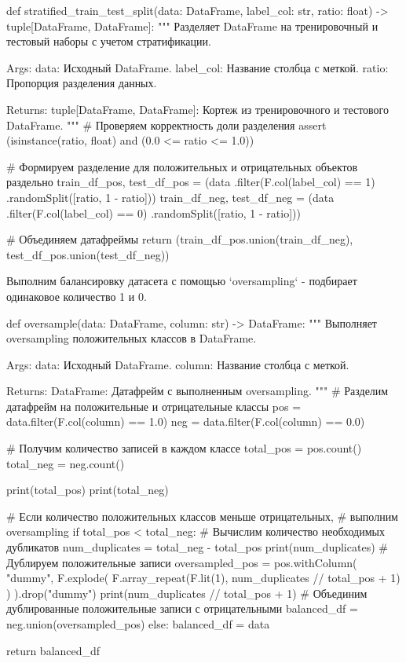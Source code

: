 \begin{code}
def stratified_train_test_split(data: DataFrame, 
                                label_col: str,
                                ratio: float) -> tuple[DataFrame, DataFrame]:
    """
    Разделяет DataFrame на тренировочный и тестовый наборы с учетом стратификации.

    Args:
        data: Исходный DataFrame.
        label_col: Название столбца с меткой.
        ratio: Пропорция разделения данных.

    Returns:
        tuple[DataFrame, DataFrame]: Кортеж из тренировочного и тестового DataFrame.
    """
    # Проверяем корректность доли разделения
    assert (isinstance(ratio, float) and (0.0 <= ratio <= 1.0))
    
    # Формируем разделение для положительных и отрицательных объектов раздельно
    train_df_pos, test_df_pos = (data
                                 .filter(F.col(label_col) == 1)
                                 .randomSplit([ratio, 1 - ratio]))
    train_df_neg, test_df_neg = (data
                                 .filter(F.col(label_col) == 0)
                                 .randomSplit([ratio, 1 - ratio]))
    
    # Объединяем датафреймы
    return (train_df_pos.union(train_df_neg),
            test_df_pos.union(test_df_neg))
\end{code}


\p Выполним балансировку датасета с помощью `oversampling` - подбирает одинаковое количество 1 и 0. 

\begin{code}
def oversample(data: DataFrame, column: str) -> DataFrame:
    """
    Выполняет oversampling положительных классов в DataFrame.

    Args:
        data: Исходный DataFrame.
        column: Название столбца с меткой.

    Returns:
        DataFrame: Датафрейм с выполненным oversampling.
    """
    # Разделим датафрейм на положительные и отрицательные классы
    pos = data.filter(F.col(column) == 1.0)
    neg = data.filter(F.col(column) == 0.0)

    # Получим количество записей в каждом классе
    total_pos = pos.count()
    total_neg = neg.count()
    
    print(total_pos)
    print(total_neg)

    # Если количество положительных классов меньше отрицательных,
    # выполним oversampling
    if total_pos < total_neg:
        # Вычислим количество необходимых дубликатов
        num_duplicates = total_neg - total_pos
        print(num_duplicates)
        # Дублируем положительные записи
        oversampled_pos = pos.withColumn(
            "dummy",
            F.explode(
                F.array_repeat(F.lit(1),
                               num_duplicates // total_pos + 1)
            )
        ).drop("dummy")
        print(num_duplicates // total_pos + 1)
        # Объединим дублированные положительные записи с отрицательными
        balanced_df = neg.union(oversampled_pos)
    else:
        balanced_df = data

    return balanced_df
\end{code}

